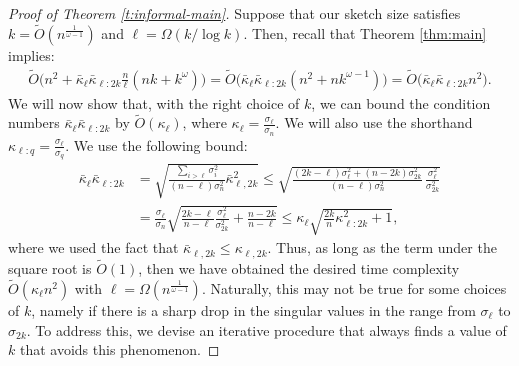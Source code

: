 \documentclass[11pt]{article}
\begin{document}
\begin{proof}[Proof of Theorem \ref{t:informal-main}] 
Suppose that our sketch size satisfies $k=\tilde O(n^{\frac1{\omega-1}})$ and $\ell=\Omega(k/\log k)$. Then, recall that Theorem \ref{thm:main} implies:
\begin{align*}
    \tilde O\Big(n^2 + \bar\kappa_{\ell}\bar\kappa_{\ell:2k}\frac n\ell (nk + k^\omega)\Big)
= \tilde O\Big(\bar\kappa_{\ell}\bar\kappa_{\ell:2k}(n^2 + nk^{\omega-1})\Big) = \tilde O\big(\bar\kappa_{\ell}\bar\kappa_{\ell:2k}n^2\big).
\end{align*}
We will now show that, with the right choice of $k$, we can bound the condition numbers $\bar\kappa_{\ell}\bar\kappa_{\ell:2k}$ by $\tilde O(\kappa_\ell)$, where $\kappa_\ell=\frac{\sigma_\ell}{\sigma_n}$. We will also use the shorthand $\kappa_{\ell:q}=\frac{\sigma_\ell}{\sigma_q}$. 
We use the following bound:
\begin{align}
    \bar\kappa_{\ell}\bar\kappa_{\ell:2k} 
    &= \sqrt{\frac{\sum_{i>\ell}\sigma_i^2}{(n-\ell)\sigma_n^2}\bar\kappa^2_{\ell,2k}}
     \leq 
        \sqrt{\frac{(2k-\ell)\sigma_{\ell}^2+(n-2k)\sigma_{2k}^2}{(n-\ell)\sigma_{n}^2}\,
        \frac{\sigma_{\ell}^2}{\sigma_{2k}^2}}
        \nonumber\\
& = \frac{\sigma_\ell}{\sigma_n}\sqrt{\frac{2k-\ell}{n-\ell}\frac{\sigma_\ell^2}{\sigma_{2k}^2} + \frac{n-2k}{n-\ell}}\leq \kappa_\ell\sqrt{\frac{2k}n\kappa_{\ell:2k}^2+1},\label{eq:doubling-trick}
\end{align}
where we used the fact that $\bar\kappa_{\ell,2k}\leq\kappa_{\ell,2k}$. Thus, as long as the term under the square root is $\tilde O(1)$, then we have obtained the desired time complexity $\tilde O(\kappa_\ell n^2)$ with $\ell=\Omega(n^{\frac1{\omega-1}})$. Naturally, this may not be true for some choices of $k$, namely if there is a sharp drop in the singular values in the range from $\sigma_\ell$ to $\sigma_{2k}$. To address this, we devise an iterative procedure that always finds a value of $k$ that avoids this phenomenon.


\end{proof}
\end{document}
